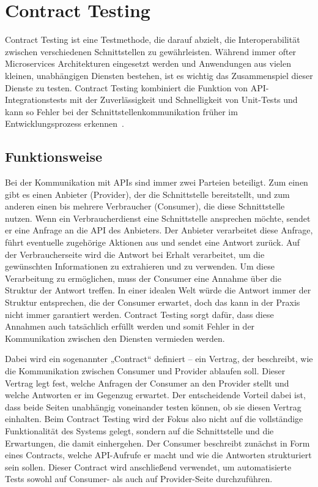 \section{Contract Testing}\label{sec:foundation_contracttesting}

Contract Testing ist eine Testmethode, die darauf abzielt, die Interoperabilität zwischen verschiedenen Schnittstellen zu gewährleisten.
Während immer ofter Microservices Architekturen eingesetzt werden und Anwendungen aus vielen kleinen, unabhängigen Diensten bestehen, ist es wichtig das Zusammenspiel dieser Dienste zu testen.
Contract Testing kombiniert die Funktion von \gls{API}-Integrationstests mit der Zuverlässigkeit und Schnelligkeit von Unit-Tests und kann so Fehler bei der Schnittstellenkommunikation früher im Entwicklungsprozess erkennen~\cite{cruzContractTestingAction2025}.

\subsection{Funktionsweise}\label{subsec:foundation_contracttesting_concept}

Bei der Kommunikation mit \glspl{API} sind immer zwei Parteien beteiligt.
Zum einen gibt es einen Anbieter (Provider), der die Schnittstelle bereitstellt, und zum anderen einen bis mehrere Verbraucher (Consumer), die diese Schnittstelle nutzen. %
Wenn ein Verbraucherdienst eine Schnittstelle ansprechen möchte, sendet er eine Anfrage an die \gls{API} des Anbieters.
Der Anbieter verarbeitet diese Anfrage, führt eventuelle zugehörige Aktionen aus und sendet eine Antwort zurück.
Auf der Verbraucherseite wird die Antwort bei Erhalt verarbeitet, um die gewünschten Informationen zu extrahieren und zu verwenden.
Um diese Verarbeitung zu ermöglichen, muss der Consumer eine Annahme über die Struktur der Antwort treffen.
In einer idealen Welt würde die Antwort immer der Struktur entsprechen, die der Consumer erwartet, doch das kann in der Praxis nicht immer garantiert werden.
Contract Testing sorgt dafür, dass diese Annahmen auch tatsächlich erfüllt werden und somit Fehler in der Kommunikation zwischen den Diensten vermieden werden.

Dabei wird ein sogenannter „Contract“ definiert – ein Vertrag, der beschreibt, wie die Kommunikation zwischen Consumer und Provider ablaufen soll.
Dieser Vertrag legt fest, welche Anfragen der Consumer an den Provider stellt und welche Antworten er im Gegenzug erwartet.
Der entscheidende Vorteil dabei ist, dass beide Seiten unabhängig voneinander testen können, ob sie diesen Vertrag einhalten.
Beim Contract Testing wird der Fokus also nicht auf die vollständige Funktionalität des Systems gelegt, sondern auf die Schnittstelle und die Erwartungen, die damit einhergehen.
Der Consumer beschreibt zunächst in Form eines Contracts, welche \gls{API}-Aufrufe er macht und wie die Antworten strukturiert sein sollen.
Dieser Contract wird anschließend verwendet, um automatisierte Tests sowohl auf Consumer- als auch auf Provider-Seite durchzuführen.

